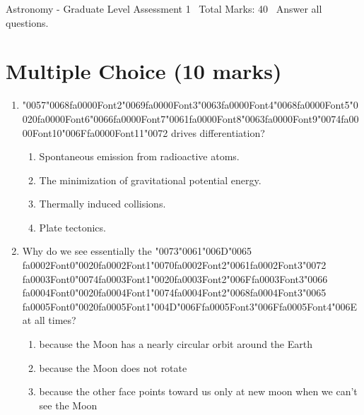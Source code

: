 \documentclass[12pt]{article}
\begin{document}
\begin{center}
Astronomy - Graduate Level Assessment 1 \
Total Marks: 40 \
Answer all questions.
\end{center}

\section*{Multiple Choice (10 marks)}
\begin{enumerate}[label=\arabic*.]
\item {\char"0057}{\char"0068}{\csname fa0000Font2\endcsname\char"0069}{\csname fa0000Font3\endcsname\char"0063}{\csname fa0000Font4\endcsname\char"0068}{\csname fa0000Font5\endcsname\char"0020}{\csname fa0000Font6\endcsname\char"0066}{\csname fa0000Font7\endcsname\char"0061}{\csname fa0000Font8\endcsname\char"0063}{\csname fa0000Font9\endcsname\char"0074}{\csname fa0000Font10\endcsname\char"006F}{\csname fa0000Font11\endcsname\char"0072} drives differentiation?
\begin{enumerate}[label=(\alph*)]
    \item Spontaneous emission from radioactive atoms.
    \item The minimization of gravitational potential energy.
    \item Thermally induced collisions.
    \item Plate tectonics.
\end{enumerate}
\item Why do we see essentially the {\char"0073}{\char"0061}{\char"006D}{\char"0065} {\csname fa0002Font0\endcsname\char"0020}{\csname fa0002Font1\endcsname\char"0070}{\csname fa0002Font2\endcsname\char"0061}{\csname fa0002Font3\endcsname\char"0072} {\csname fa0003Font0\endcsname\char"0074}{\csname fa0003Font1\endcsname\char"0020}{\csname fa0003Font2\endcsname\char"006F}{\csname fa0003Font3\endcsname\char"0066} {\csname fa0004Font0\endcsname\char"0020}{\csname fa0004Font1\endcsname\char"0074}{\csname fa0004Font2\endcsname\char"0068}{\csname fa0004Font3\endcsname\char"0065} {\csname fa0005Font0\endcsname\char"0020}{\csname fa0005Font1\endcsname\char"004D}{\char"006F}{\csname fa0005Font3\endcsname\char"006F}{\csname fa0005Font4\endcsname\char"006E} at all times?
\begin{enumerate}[label=(\alph*)]
    \item because the Moon has a nearly circular orbit around the Earth
    \item because the Moon does not rotate
    \item because the other face points toward us only at new moon when we can't see the Moon

\end{enumerate}
\end{enumerate}
\end{document}
